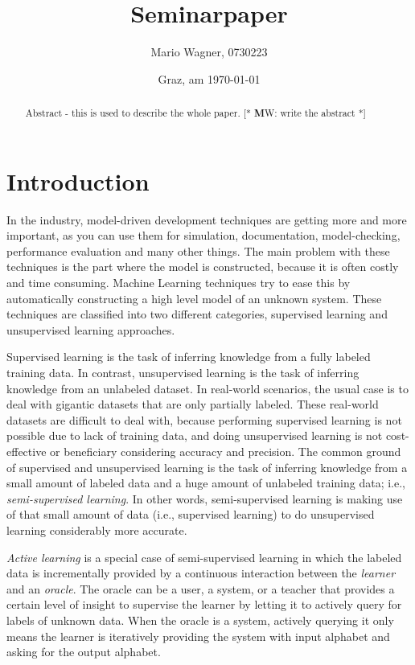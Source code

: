 \documentclass[
a4paper,
12pt
]{scrartcl}
\title{Seminarpaper}
\author{Mario Wagner, 0730223}
\date{Graz, am \today{}}
\newcommand\mw[1]{ [* {\textbf MW:} #1 *]}
\begin{document}
 \maketitle
 \tableofcontents
 \listoffigures
 \listoftables

\newpage



\begin{abstract}
  Abstract - this is used to describe the whole paper.
  \mw{write the abstract}
\end{abstract}



\section{Introduction}
In the industry, model-driven development techniques are getting more and more important, as you can use them for simulation, documentation, model-checking, performance evaluation and many other things. The main problem with these techniques is the part where the model is constructed, because it is often costly and time consuming. Machine Learning techniques try to ease this by automatically constructing a high level model of an unknown system. These techniques are classified into two different categories, supervised learning and unsupervised learning approaches.

\par Supervised learning is the task of inferring knowledge from a fully labeled training data. In contrast, unsupervised learning is the task of inferring knowledge from an unlabeled dataset. In real-world scenarios, the usual case is to deal with gigantic datasets that are only partially labeled. These real-world datasets are difficult to deal with, because performing supervised learning is not possible due to lack of training data, and doing unsupervised learning is not cost-effective or beneficiary considering accuracy and precision. The common ground of supervised and unsupervised learning is the task of inferring knowledge from a small amount of labeled data and a huge amount of unlabeled training data; i.e., \emph{semi-supervised learning}. In other words, semi-supervised learning is making use of that small amount of data (i.e., supervised learning) to do unsupervised learning considerably more accurate.

\par \emph{Active learning} is a special case of semi-supervised learning in which the labeled data is incrementally provided by a continuous interaction between the \emph{learner} and an \emph{oracle}. The oracle can be a user, a system, or a teacher that provides a certain level of insight to supervise the learner by letting it to actively query for labels of unknown data. When the oracle is a system, actively querying it only means the learner is iteratively providing the system with input alphabet and asking for the output alphabet.
\end{document}
